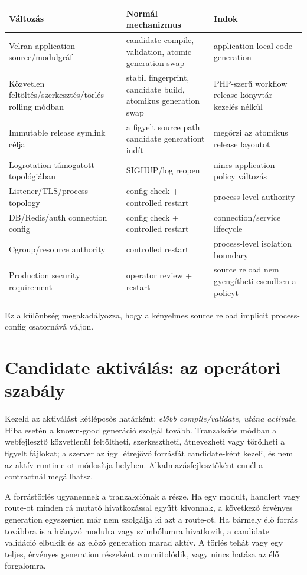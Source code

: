 \begin{longtable}{L{0.28\textwidth}L{0.30\textwidth}L{0.32\textwidth}}
\toprule
Változás & Normál mechanizmus & Indok \\
\midrule
Velran application source/modulgráf & candidate compile, validation, atomic generation swap & application-local code generation \\
Közvetlen feltöltés/szerkesztés/törlés rolling módban & stabil fingerprint, candidate build, atomikus generation swap & PHP-szerű workflow release-könyvtár kezelés nélkül \\
Immutable release symlink célja & a figyelt source path candidate generationt indít & megőrzi az atomikus release layoutot \\
Logrotation támogatott topológiában & SIGHUP/log reopen & nincs application-policy változás \\
Listener/TLS/process topology & config check + controlled restart & process-level authority \\
DB/Redis/auth connection config & config check + controlled restart & connection/service lifecycle \\
Cgroup/resource authority & controlled restart & process-level isolation boundary \\
Production security requirement & operator review + restart & source reload nem gyengítheti csendben a policyt \\
\bottomrule
\end{longtable}

Ez a különbség megakadályozza, hogy a kényelmes source reload implicit process-config csatornává váljon.

\section{Candidate aktiválás: az operátori szabály}

Kezeld az aktiválást kétlépcsős határként: \emph{előbb compile/validate, utána activate}. Hiba esetén a known-good generáció szolgál tovább. Tranzakciós  módban a webfejlesztő közvetlenül feltöltheti, szerkesztheti, átnevezheti vagy törölheti a figyelt  fájlokat; a szerver az így létrejövő forrásfát candidate-ként kezeli, és nem az aktív runtime-ot módosítja helyben. Alkalmazásfejlesztőként ennél a contractnál megállhatsz.

A forrástörlés ugyanennek a tranzakciónak a része. Ha egy modult, handlert vagy route-ot minden rá mutató hivatkozással együtt kivonnak, a következő érvényes generation egyszerűen már nem szolgálja ki azt a route-ot. Ha bármely élő forrás továbbra is a hiányzó modulra vagy szimbólumra hivatkozik, a candidate validáció elbukik és az előző generation marad aktív. A törlés tehát vagy egy teljes, érvényes generation részeként commitolódik, vagy nincs hatása az élő forgalomra.

